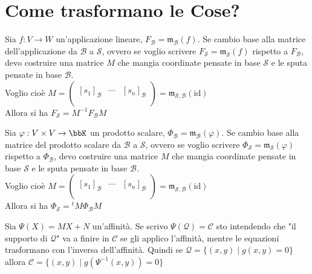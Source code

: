 \documentclass[a4paper,NoNotes]{stdmdoc}
\newcommand{\Id}{\mbox{id}}
\newcommand{\Mtr}{\mathfrak{m}}
\begin{document}
	\section*{Come trasformano le Cose?}
	Sia $f: V \rightarrow W$ un'applicazione lineare, $F_{\mathcal{B}} = \Mtr_{\mathcal{B}}(f)$. Se cambio base alla matrice dell'applicazione da $\mathcal{B}$ a $\mathcal{S}$, ovvero se voglio scrivere $F_{\mathcal{S}} = \Mtr_{\mathcal{S}}(f)$ rispetto a $F_{\mathcal{B}}$, devo costruire una matrice $M$ che mangia coordinate pensate in base $\mathcal{S}$ e le sputa pensate in base $\mathcal{B}$. \\
	Voglio cioè $M = \left( \begin{array}{c|c|c}  & & \\ {[s_1]}_{\mathcal{B}} & \cdots & {[s_n]}_{\mathcal{B}} \\  &  &  \\ \end{array} \right) = \Mtr_{\mathcal{S}, \mathcal{B}}(\Id)$ \\
	Allora si ha $F_{\mathcal{S}} = M^{-1}F_{\mathcal{B}}M$

	Sia $\varphi: V \times V \rightarrow \bbK$ un prodotto scalare, $\Phi_{\mathcal{B}} = \Mtr_{\mathcal{B}}(\varphi)$. Se cambio base alla matrice del prodotto scalare da $\mathcal{B}$ a $\mathcal{S}$, ovvero se voglio scrivere $\Phi_{\mathcal{S}} = \Mtr_{\mathcal{S}}(\varphi)$ rispetto a $\Phi_{\mathcal{B}}$, devo costruire una matrice $M$ che mangia coordinate pensate in base $\mathcal{S}$ e le sputa pensate in base $\mathcal{B}$. \\
	Voglio cioè $M = \left( \begin{array}{c|c|c} & & \\ {[s_1]}_{\mathcal{B}} & \cdots & {[s_n]}_{\mathcal{B}} \\ & & \\ \end{array} \right) = \Mtr_{\mathcal{S}, \mathcal{B}}(\Id)$ \\
	Allora si ha $\Phi_{\mathcal{S}} = {}^tM\Phi_{\mathcal{B}}M$
	
	Sia $\Psi(X) = MX+N$ un'affinità. Se scrivo $\Psi(\mathcal{Q}) = \mathcal{C}$ sto intendendo che "il supporto di $\mathcal{Q}$" va a finire in $\mathcal{C}$ se gli applico l'affinità, mentre le equazioni trasformano con l'inversa dell'affinità. Quindi se $\mathcal{Q} = \{(x,y) \mid g(x,y) = 0\}$ allora $\mathcal{C} = \{(x,y) \mid g(\Psi^{-1}(x,y)) = 0\}$
\end{document}
